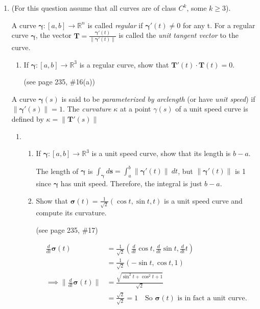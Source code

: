 \documentclass{article}
\newcommand{\norm}[1]{\| #1 \|}
\newcommand{\deriv}[1]{\frac{d}{d #1}}
\newcommand{\gam}{\boldsymbol{\gamma}}
\begin{document}
\thispagestyle{fancy}

\begin{enumerate}
    \item (For this question assume that all curves are of class $C^k$, some $k \geq 3$).

        A curve $\gam : [a,b] \rightarrow \mathbb{R}^n$ is called \textit{regular} if $\gam'(t) \not = 0$ for any t. For a regular curve $\gam$, the vector $\displaystyle \boldsymbol{T} = \frac{\gam ' (t)}{\norm{\gam '(t)}}$ is called the \textit{unit tangent vector} to the curve.
        \begin{enumerate}
            \item If $\gam : [a,b] \rightarrow \mathbb{R}^3$ is a regular curve, show that $\boldsymbol{T}'(t) \cdot \boldsymbol{T}(t) = 0$.

                (see page 235, \#16(a))
        \end{enumerate}
        A curve $\gam (s)$ is said to be \textit{parameterized by arclength} (or have \textit{unit speed}) if $\norm{\gam '(s)} = 1$. The \textit{curvature} $\kappa$ at a point $\gamma(s)$ of a unit speed curve is defined by $\kappa = \norm{\boldsymbol{T}'(s)}$
        \begin{enumerate}[resume]
            \item
                \begin{enumerate}[label=(\roman*)]
                    \item If $\gam : [a,b] \rightarrow \mathbb{R}^3$ is a unit speed curve, show that its length is $b - a$.

                        The length of $\gam$ is $\displaystyle \int_{\gam} d \boldsymbol{s} = \int_a^b \norm{\gam ' (t)} \ dt$, but $\norm{\gam ' (t)}$ is 1 since $\gam$ has unit speed. Therefore, the integral is just $b-a$.

                    \item Show that $\boldsymbol{\sigma}(t) = \frac{1}{\sqrt{2}}(\cos t, \sin t, t)$ is a unit speed curve and compute its curvature.
                        
                        (see page 235, \#17)

                        \begin{align*}
                            \frac{d}{dt} \boldsymbol{\sigma}(t) &= \frac{1}{\sqrt{2}}(\deriv{t} \cos t, \deriv{t} \sin t, \deriv{t} t) \\
                            &= \frac{1}{\sqrt{2}}(- \sin t, \cos t, 1) \\
                            \implies \norm{\deriv{t} \boldsymbol{\sigma}(t)} &= \frac{\sqrt{\sin^2t+\cos^2t+1}}{\sqrt{2}} \\
                            &= \frac{\sqrt{2}}{\sqrt{2}} = 1 \quad \text{So $\boldsymbol{\sigma}(t)$ is in fact a unit curve.}
                        \end{align*}


\end{enumerate}
\end{enumerate}
\end{enumerate}
\end{document}
